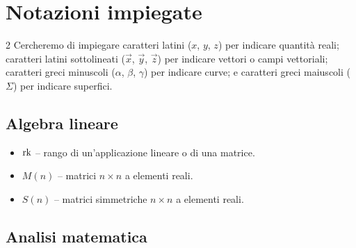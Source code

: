 \chapter*{Notazioni impiegate}
\setlength{\parindent}{2pt}

\begin{multicols*}{2}
      Cercheremo di impiegare caratteri latini ($x$, $y$, $z$) per indicare quantità reali;
      caratteri latini sottolineati ($\vec{x}$, $\vec{y}$, $\vec{z}$) per indicare
      vettori o campi vettoriali; caratteri greci minuscoli ($\alpha$, $\beta$, $\gamma$) per indicare
      curve; e caratteri greci maiuscoli ($\Sigma$) per indicare superfici.

      \section*{Algebra lineare}

      \begin{itemize}
            \item $\operatorname{rk}$ -- rango di un'applicazione lineare o di una matrice.
            \item $M(n)$ -- matrici $n \times n$ a elementi reali.
            \item $S(n)$ -- matrici simmetriche $n \times n$ a elementi reali.
      \end{itemize}

      \section*{Analisi matematica}


\end{multicols*}
